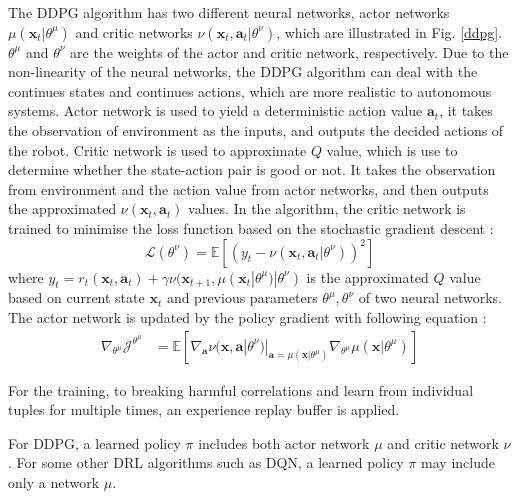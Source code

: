 The DDPG algorithm has two different neural networks, actor networks $\mu(\textbf{x}_t|\theta^\mu)$ and critic networks $\nu(\textbf{x}_t,\textbf{a}_t|\theta^\nu)$, which are illustrated in Fig. \ref{ddpg}. $\theta^\mu$ and $\theta^\nu$ are the weights of the actor and critic network, respectively. Due to the non-linearity of the neural networks, the DDPG algorithm can deal with the continues states and continues actions, which are more realistic to autonomous systems. Actor network is used to yield a deterministic action value $\textbf{a}_t$, it takes the observation of environment as the inputs, and outputs the decided actions of the robot. Critic network is used to approximate $Q$ value, which is use to determine whether the state-action pair is good or not. It takes the observation from environment and the action value from actor networks, and then outputs the approximated $\nu(\textbf{x}_t,\textbf{a}_t)$ values. In the algorithm, the 
critic network is trained to minimise the loss function based on the stochastic gradient descent \cite{lillicrap2015continuous}:
\begin{equation}
    \mathcal{L}(\theta^\nu) = \mathbb{E}[(y_t - \nu(\textbf{x}_t,\textbf{a}_t|\theta^\nu))^2]
\end{equation}
where $y_t = r_t(\textbf{x}_t,\textbf{a}_t)+\gamma \nu(\textbf{x}_{t+1},\mu(\textbf{x}_t|\theta^\mu)|\theta^\nu)$ is the approximated $Q$ value based on current state $\textbf{x}_t$ and previous parameters $\theta^\mu, \theta^\nu$ of two neural networks.
%
The actor network is updated by the policy gradient with following equation \cite{lillicrap2015continuous}:
\begin{align}\label{DDPG}
    \nabla_{\theta^\mu}\mathcal{J}^{\theta^\mu} &= \mathbb{E}[\nabla_{\textbf{a}}\nu(\textbf{x},\textbf{a}|\theta^\nu)|_{\textbf{a}=\mu(\textbf{x}|\theta^\mu)}\nabla_{\theta^\mu}\mu(\textbf{x}|\theta^\mu)]
\end{align}

For the training, to breaking harmful correlations and learn from individual tuples for  multiple times, an experience replay buffer is applied. 

For DDPG, a learned policy $\pi$ includes both actor network $\mu$ and critic network $\nu$. For some other DRL algorithms such as DQN, a learned policy $\pi$ may include only a  network $\mu$. 



